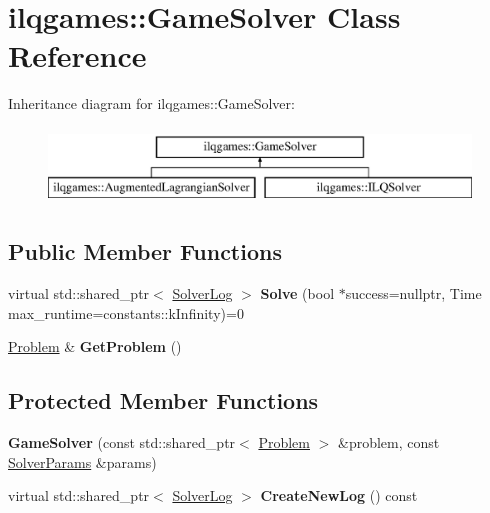 \hypertarget{classilqgames_1_1_game_solver}{}\section{ilqgames\+:\+:Game\+Solver Class Reference}
\label{classilqgames_1_1_game_solver}
Inheritance diagram for ilqgames\+:\+:Game\+Solver\+:\begin{figure}[H]
\begin{center}
\leavevmode
\includegraphics[height=2.000000cm]{classilqgames_1_1_game_solver}
\end{center}
\end{figure}
\subsection*{Public Member Functions}
\begin{DoxyCompactItemize}
\item 
virtual std\+::shared\+\_\+ptr$<$ \hyperlink{classilqgames_1_1_solver_log}{Solver\+Log} $>$ {\bfseries Solve} (bool $\ast$success=nullptr, Time max\+\_\+runtime=constants\+::k\+Infinity)=0\hypertarget{classilqgames_1_1_game_solver_adfc52c3804a21ccd8fc0d7940bfdfcbe}{}\label{classilqgames_1_1_game_solver_adfc52c3804a21ccd8fc0d7940bfdfcbe}

\item 
\hyperlink{classilqgames_1_1_problem}{Problem} \& {\bfseries Get\+Problem} ()\hypertarget{classilqgames_1_1_game_solver_a03e86a0b9070715738e11b9cfbc93321}{}\label{classilqgames_1_1_game_solver_a03e86a0b9070715738e11b9cfbc93321}

\end{DoxyCompactItemize}
\subsection*{Protected Member Functions}
\begin{DoxyCompactItemize}
\item 
{\bfseries Game\+Solver} (const std\+::shared\+\_\+ptr$<$ \hyperlink{classilqgames_1_1_problem}{Problem} $>$ \&problem, const \hyperlink{structilqgames_1_1_solver_params}{Solver\+Params} \&params)\hypertarget{classilqgames_1_1_game_solver_af7aed039cfd1c7dd88c40ff710caf97a}{}\label{classilqgames_1_1_game_solver_af7aed039cfd1c7dd88c40ff710caf97a}

\item 
virtual std\+::shared\+\_\+ptr$<$ \hyperlink{classilqgames_1_1_solver_log}{Solver\+Log} $>$ {\bfseries Create\+New\+Log} () const \hypertarget{classilqgames_1_1_game_solver_add427a4fe7b7d3d0e2dbb4a47105c765}{}\label{classilqgames_1_1_game_solver_add427a4fe7b7d3d0e2dbb4a47105c765}

\end{DoxyCompactItemize}
